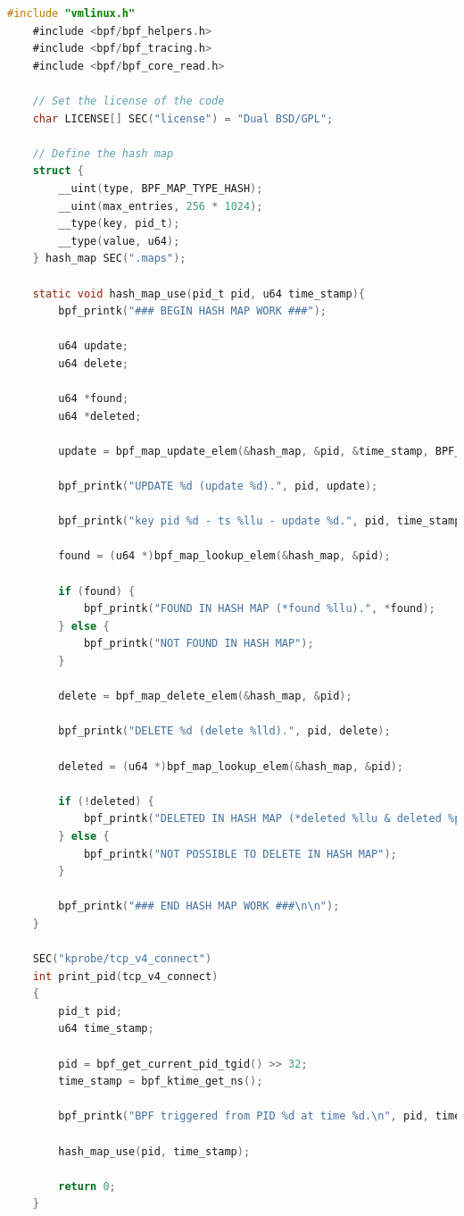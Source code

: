 \begin{lstlisting}[style=cstyle, language=C, caption={libbpf-bootstrap kernel-side program with maps}]
	#include "vmlinux.h"
	#include <bpf/bpf_helpers.h>
	#include <bpf/bpf_tracing.h>
	#include <bpf/bpf_core_read.h>
	
	// Set the license of the code
	char LICENSE[] SEC("license") = "Dual BSD/GPL";
	
	// Define the hash map
	struct {
		__uint(type, BPF_MAP_TYPE_HASH);
		__uint(max_entries, 256 * 1024);
		__type(key, pid_t);
		__type(value, u64);
	} hash_map SEC(".maps");
	
	static void hash_map_use(pid_t pid, u64 time_stamp){
		bpf_printk("### BEGIN HASH MAP WORK ###");
		
		u64 update;
		u64 delete;
		
		u64 *found;
		u64 *deleted;
		
		update = bpf_map_update_elem(&hash_map, &pid, &time_stamp, BPF_ANY);
		
		bpf_printk("UPDATE %d (update %d).", pid, update);
		
		bpf_printk("key pid %d - ts %llu - update %d.", pid, time_stamp, update);
		
		found = (u64 *)bpf_map_lookup_elem(&hash_map, &pid);
		
		if (found) {
			bpf_printk("FOUND IN HASH MAP (*found %llu).", *found);
		} else {
			bpf_printk("NOT FOUND IN HASH MAP");
		}
		
		delete = bpf_map_delete_elem(&hash_map, &pid);
		
		bpf_printk("DELETE %d (delete %lld).", pid, delete);
		
		deleted = (u64 *)bpf_map_lookup_elem(&hash_map, &pid);
		
		if (!deleted) {
			bpf_printk("DELETED IN HASH MAP (*deleted %llu & deleted %p).", *deleted, deleted);
		} else {
			bpf_printk("NOT POSSIBLE TO DELETE IN HASH MAP");
		}
		
		bpf_printk("### END HASH MAP WORK ###\n\n");
	}
	
	SEC("kprobe/tcp_v4_connect")
	int print_pid(tcp_v4_connect)   
	{
		pid_t pid;
		u64 time_stamp;
		
		pid = bpf_get_current_pid_tgid() >> 32;
		time_stamp = bpf_ktime_get_ns();    
		
		bpf_printk("BPF triggered from PID %d at time %d.\n", pid, time_stamp);
		
		hash_map_use(pid, time_stamp);
		
		return 0;
	}
\end{lstlisting}

